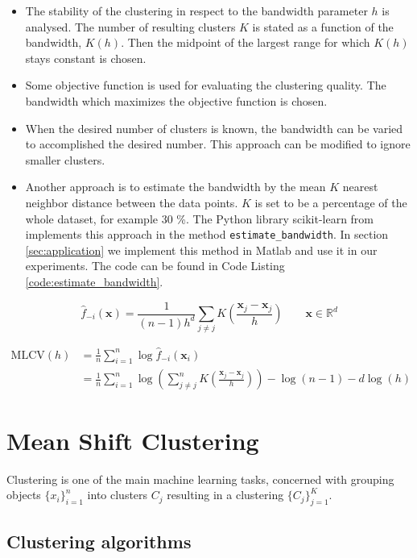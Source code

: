 \documentclass{article}
\begin{document}
\begin{itemize}
	\item The stability of the clustering in respect to the bandwidth parameter $h$ is analysed. The number of resulting clusters $K$ is stated as a function of the bandwidth, $K(h)$. Then the midpoint of the largest range for which $K(h)$ stays constant is chosen.
	\item Some objective function is used for evaluating the clustering quality. The bandwidth which maximizes the objective function is chosen.
	\item When the desired number of clusters is known, the bandwidth can be varied to accomplished the desired number. This approach can be modified to ignore smaller clusters.
	\item Another approach is to estimate the bandwidth by the mean $K$ nearest neighbor distance between the data points. $K$ is set to be a percentage of the whole dataset, for example 30 \%. The Python library scikit-learn from \cite{Pedregosa.2011} implements this approach in the method \texttt{estimate\_bandwidth}. In section \ref{sec:application} we implement this method in Matlab and use it in our experiments. The code can be found in Code Listing \ref{code:estimate_bandwidth}.
\end{itemize}

\begin{equation}
\hat{f}_{-i}(\bm{x}) = \frac{1}{(n - 1)h^d} \sum_{j \neq j} K\left(\frac{\bm{x}_j - \bm{x}_j}{h} \right) \qquad \bm{x} \in \mathbb{R}^d
\end{equation}

\begin{align}
\text{MLCV}(h) &= \frac{1}{n} \sum_{i=1}^n \log \hat{f}_{-i}(\bm{x}_i) \\
&= \frac{1}{n} \sum_{i=1}^n \log \left(\sum_{j \neq j}^n K\left(\frac{\bm{x}_j - \bm{x}_j}{h} \right)\right) - \log(n - 1) - d \log(h)
\end{align}





\section{Mean Shift Clustering}

Clustering is one of the main machine learning tasks, concerned with grouping objects $\{x_i\}_{i=1}^n$ into clusters $C_j$ resulting in a clustering $\{ C_j \}_{j=1}^K$.

\subsection{Clustering algorithms}
\end{document}
